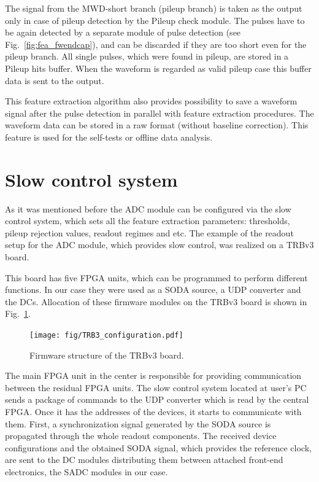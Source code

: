 \documentclass[12pt,a4paper, twocolumn]{article}
\newcommand{\Reffig}[1]{Fig.~\ref{#1}}
\begin{document}
The signal from the MWD-short branch (pileup branch) is taken as the output only in case of pileup detection by the Pileup check module. The pulses have to be again detected by a separate module of pulse detection (see \Reffig{fig:fea_fwendcap}), and can be discarded if they are too short even for the pileup branch. All single pulses, which were found in pileup, are stored in a Pileup hits buffer. When the waveform is regarded as valid pileup case this buffer data is sent to the output.

	This feature extraction algorithm also provides possibility to save a waveform signal after the pulse detection in parallel with feature extraction procedures. The waveform data can be stored in a raw format (without baseline correction). This feature is used for the self-tests or offline data analysis.
\section{Slow control system}
As it was mentioned before the ADC module can be configured via the slow control system, which sets all the feature extraction parameters: thresholds, pileup rejection values, readout regimes and etc. The example of the readout setup for the ADC module, which provides slow control, was realized on a TRBv3 board.

This board has five FPGA units, which can be programmed to perform different functions. In our case they were used as a SODA source, a UDP converter and the DCs. Allocation of these firmware modules on the TRBv3 board is shown in \Reffig{fig:fea_TRBv3}.
\begin{figure}[h]
    \texttt{[image: fig/TRB3\_configuration.pdf]}
    \caption[Hardware scheme of the TRBv3 board]{
    Firmware structure of the TRBv3 board.}
    \label{fig:fea_TRBv3}
\end{figure}

The main FPGA unit in the center is responsible for providing communication between the residual FPGA units. The slow control system located at user's PC sends a package of commands to the UDP converter which is read by the central FPGA. Once it has the addresses of the devices, it starts to communicate with them. First, a synchronization signal generated by the SODA source is propagated through the whole readout components. The received  device configurations and the obtained SODA signal, which provides the reference clock, are sent to the DC modules distributing them between attached front-end electronics, the SADC modules in our case.
\end{document}
